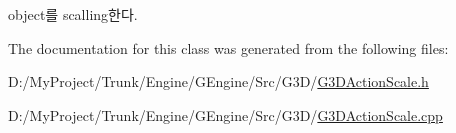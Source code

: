 \begin{DoxyItemize}
\item object를 scalling한다. 
\end{DoxyItemize}

The documentation for this class was generated from the following files\+:\begin{DoxyCompactItemize}
\item 
D\+:/\+My\+Project/\+Trunk/\+Engine/\+G\+Engine/\+Src/\+G3\+D/\hyperlink{_g3_d_action_scale_8h}{G3\+D\+Action\+Scale.\+h}\item 
D\+:/\+My\+Project/\+Trunk/\+Engine/\+G\+Engine/\+Src/\+G3\+D/\hyperlink{_g3_d_action_scale_8cpp}{G3\+D\+Action\+Scale.\+cpp}\end{DoxyCompactItemize}

